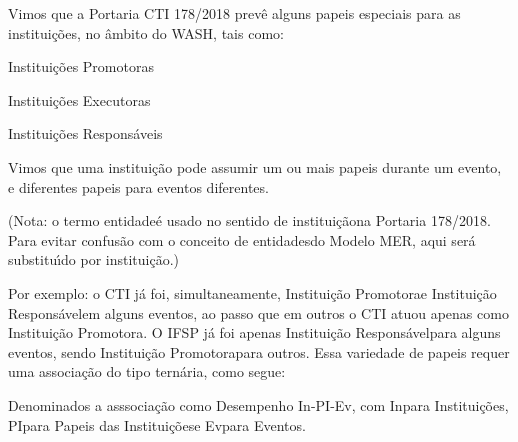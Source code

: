 \documentclass[
12pt,		%
openright,	%
twoside,  %
a4paper,			%
chapter=TITLE,		%
english,			%
french,				%
spanish,			%
brazil				%
]{USPSC-classe/USPSC}
\begin{document}
Vimos que a Portaria CTI 178/2018 prev\^e alguns papeis especiais para as institui\c{c}\~oes, no \^ambito do WASH, tais como:





\begin{alineas}
\item Institui\c{c}\~oes Promotoras
\item Institui\c{c}\~oes Executoras
\item Institui\c{c}\~oes Respons\'aveis
\end{alineas}

Vimos que uma institui\c{c}\~ao pode assumir um ou mais papeis durante um evento, e diferentes papeis para eventos diferentes.




(Nota: o termo \textquotedbl entidade\textquotedbl  \'e usado no sentido de \textquotedbl institui\c{c}\~ao\textquotedbl  na Portaria 178/2018. Para evitar confus\~ao com o conceito de \textquotedbl entidades\textquotedbl  do Modelo MER, aqui ser\'a substitu\'{\i}do por \textquotedbl institui\c{c}\~ao\textquotedbl .)




Por exemplo: o CTI j\'a foi, simultaneamente, \textquotedbl Institui\c{c}\~ao Promotora\textquotedbl  e \textquotedbl Institui\c{c}\~ao Respons\'avel\textquotedbl  em alguns eventos, ao passo que em outros o CTI atuou apenas como \textquotedbl Institui\c{c}\~ao Promotora\textquotedbl . O IFSP j\'a foi apenas \textquotedbl Institui\c{c}\~ao Respons\'avel\textquotedbl  para alguns eventos, sendo \textquotedbl Institui\c{c}\~ao Promotora\textquotedbl  para outros. Essa variedade de papeis requer uma associa\c{c}\~ao do tipo tern\'aria, como segue:






Denominados a asssocia\c{c}\~ao como \textquotedbl Desempenho In-PI-Ev\textquotedbl , com \textquotedbl In\textquotedbl  para Institui\c{c}\~oes, \textquotedbl PI\textquotedbl  para \textquotedbl Papeis das Institui\c{c}\~oes\textquotedbl  e \textquotedbl Ev\textquotedbl  para \textquotedbl Eventos\textquotedbl .
\end{document}
